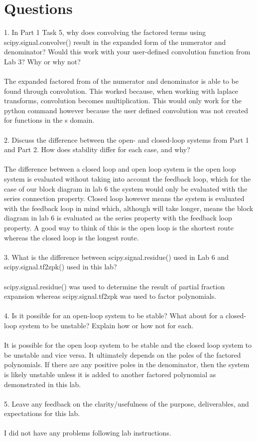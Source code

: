 \documentclass[12pt]{report}
\begin{document}
\section{Questions}
1. In Part 1 Task 5, why does convolving the factored terms using scipy.signal.convolve() result in the expanded form of the numerator and denominator? Would this work with your user-defined convolution function from Lab 3? Why or why not?
\\\\
The expanded factored from of the numerator and denominator is able to be found through convolution. This worked because, when working with laplace transforms, convolution becomes multiplication. This would only work for the python command however because the user defined convolution was not created for functions in the s domain.
\\\\
2. Discuss the difference between the open- and closed-loop systems from Part 1 and Part 2. How does stability differ for each case, and why?
\\\\
The difference between a closed loop and open loop system is the open loop system is evaluated without taking into account the feedback loop, which for the case of our block diagram in lab 6 the system would only be evaluated with the series connection property. Closed loop however means the system is evaluated with the feedback loop in mind which, although will take longer, means the block diagram in lab 6 is evaluated as the series property with the feedback loop property. A good way to think of this is the open loop is the shortest route whereas the closed loop is the longest route.
\\\\
3. What is the difference between scipy.signal.residue() used in Lab 6 and
scipy.signal.tf2zpk() used in this lab?
\\\\
scipy.signal.residue() was used to determine the result of partial fraction expansion whereas scipy.signal.tf2zpk was used to factor polynomials.
\\\\
4. Is it possible for an open-loop system to be stable? What about for a closed-loop system to be unstable? Explain how or how not for each.
\\\\
It is possible for the open loop system to be stable and the closed loop system to be unstable and vice versa. It ultimately depends on the poles of the factored polynomials. If there are any positive poles in the denominator, then the system is likely unstable unless it is added to another factored polynomial as demonstrated in this lab.
\\\\
5. Leave any feedback on the clarity/usefulness of the purpose, deliverables, and expectations for this lab.
\\\\
I did not have any problems following lab instructions.
\end{document}
